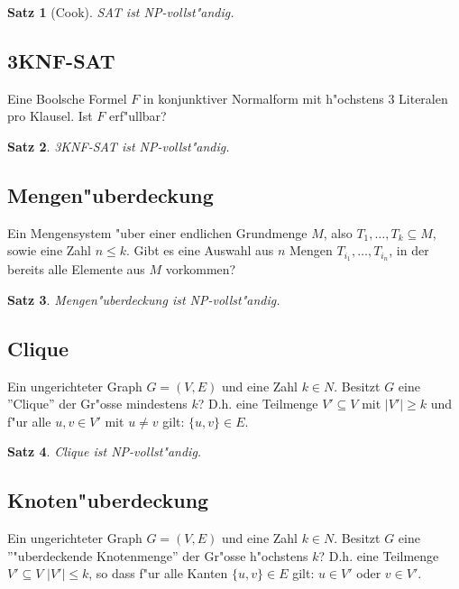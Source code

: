 \documentclass[german, 10pt, a4paper, twocolumn]{scrartcl}
\newtheorem{satz}{Satz}[section]
\theoremstyle{definition}
\theoremstyle{example}
\begin{document}
\begin{satz}[Cook]
	SAT ist NP-vollst"andig.
\end{satz}

\subsection{3KNF-SAT}

Eine Boolsche Formel $F$ in konjunktiver Normalform mit h"ochstens 3 Literalen pro Klausel. Ist $F$ erf"ullbar?

\begin{satz}
	3KNF-SAT ist NP-vollst"andig.
\end{satz}

\subsection{Mengen"uberdeckung}

Ein Mengensystem "uber einer endlichen Grundmenge $M$, also $T_1,\ldots, T_k \subseteq M$, sowie eine Zahl $n \leq k$. Gibt es eine Auswahl aus $n$ Mengen $T_{i_1},\ldots,T_{i_n}$, in der bereits alle Elemente aus $M$ vorkommen?

\begin{satz}
	Mengen"uberdeckung ist NP-vollst"andig.
\end{satz}

\subsection{Clique}

Ein ungerichteter Graph $G=(V,E)$ und eine Zahl $k \in N$. Besitzt $G$ eine ''Clique'' der Gr"osse mindestens $k$? D.h. eine Teilmenge $V' \subseteq V$ mit $|V'|\geq k$ und f"ur alle $u,v \in V'$ mit $u\neq v$ gilt: $\{ u,v \} \in E$.

\begin{satz}
	Clique ist NP-vollst"andig.
\end{satz}

\subsection{Knoten"uberdeckung}

Ein ungerichteter Graph $G=(V,E)$ und eine Zahl $k \in N$. Besitzt $G$ eine ''"uberdeckende Knotenmenge'' der Gr"osse h"ochstens $k$? D.h. eine Teilmenge $V' \subseteq V$ $|V'| \leq k$, so dass f"ur alle Kanten $\{ u,v \} \in E$ gilt: $u\in V'$ oder $v\in V'$.
\end{document}
